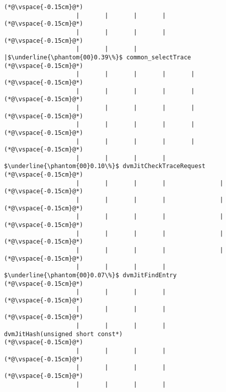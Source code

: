 \begin{lstlisting}[caption=Metodikutsu C$\to$Java 20 int-parametrilla, label=profile:C2JBenchmark00146, numberbychapter=true, frame=lines, float, floatplacement=t]
(*@\vspace{-0.15cm}@*)
                    |       |       |       |
(*@\vspace{-0.15cm}@*)
                    |       |       |       |
(*@\vspace{-0.15cm}@*)
                    |       |       |       |$\underline{\phantom{00}0.39\%}$ common_selectTrace
(*@\vspace{-0.15cm}@*)
                    |       |       |       |       |
(*@\vspace{-0.15cm}@*)
                    |       |       |       |       |
(*@\vspace{-0.15cm}@*)
                    |       |       |       |       |
(*@\vspace{-0.15cm}@*)
                    |       |       |       |       |
(*@\vspace{-0.15cm}@*)
                    |       |       |       |       |
(*@\vspace{-0.15cm}@*)
                    |       |       |       |        $\underline{\phantom{00}0.10\%}$ dvmJitCheckTraceRequest
(*@\vspace{-0.15cm}@*)
                    |       |       |       |               |
(*@\vspace{-0.15cm}@*)
                    |       |       |       |               |
(*@\vspace{-0.15cm}@*)
                    |       |       |       |               |
(*@\vspace{-0.15cm}@*)
                    |       |       |       |               |
(*@\vspace{-0.15cm}@*)
                    |       |       |       |               |
(*@\vspace{-0.15cm}@*)
                    |       |       |       |                $\underline{\phantom{00}0.07\%}$ dvmJitFindEntry
(*@\vspace{-0.15cm}@*)
                    |       |       |       |
(*@\vspace{-0.15cm}@*)
                    |       |       |       |
(*@\vspace{-0.15cm}@*)
                    |       |       |       |                        dvmJitHash(unsigned short const*)
(*@\vspace{-0.15cm}@*)
                    |       |       |       |
(*@\vspace{-0.15cm}@*)
                    |       |       |       |
(*@\vspace{-0.15cm}@*)
                    |       |       |       |

\end{lstlisting}
